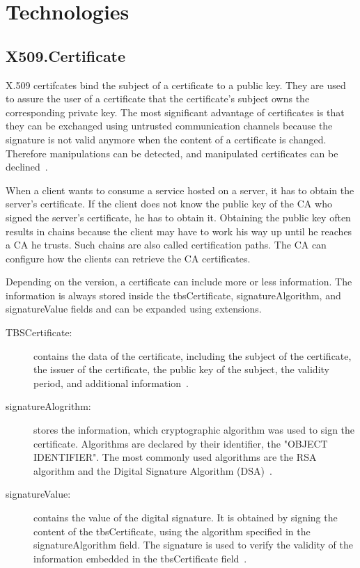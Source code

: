 
\section{Technologies}
\subsection{X509.Certificate}
X.509 certifcates bind the subject of a certificate to a public key.
They are used to assure the user of a certificate that the certificate's subject owns the corresponding private key.
The most significant advantage of certificates is that they can be exchanged using untrusted communication channels because the signature is not valid anymore when the content of a certificate is changed.
Therefore manipulations can be detected, and manipulated certificates can be declined~\cite{x509rfc}.

When a client wants to consume a service hosted on a server, it has to obtain the server's certificate.
If the client does not know the public key of the CA who signed the server's certificate, he has to obtain it.
Obtaining the public key often results in chains because the client may have to work his way up until he reaches a CA he trusts.
Such chains are also called certification paths.
The CA can configure how the clients can retrieve the CA certificates.

Depending on the version, a certificate can include more or less information.
The information is always stored inside the tbsCertificate, signatureAlgorithm, and signatureValue fields and can be expanded using extensions.
\begin{description}
	\item[TBSCertificate:] contains the data of the certificate, including the subject of the certificate, the issuer of the certificate, the public key of the subject, the validity period, and additional information~\cite{x509rfc}.
	\item[signatureAlogrithm:] stores the information, which cryptographic algorithm was used to sign the certificate.
		Algorithms are declared by their identifier, the "OBJECT IDENTIFIER".
		The most commonly used algorithms are the RSA algorithm and the Digital Signature Algorithm (DSA)~\cite{x509rfc}.
	\item[signatureValue:] contains the value of the digital signature.
		It is obtained by signing the content of the tbsCertificate, using the algorithm specified in the signatureAlgorithm field.
		The signature is used to verify the validity of the information embedded in the tbsCertificate field~\cite{x509rfc}.
\end{description}

